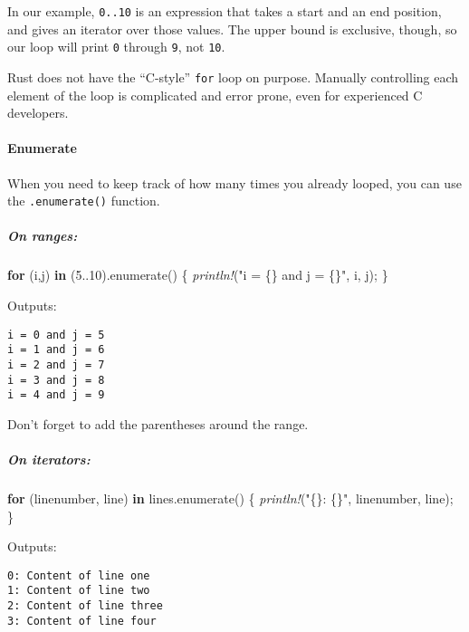 \documentclass[a4paper,]{book}
\newenvironment{Shaded}{\begin{snugshade}}{\end{snugshade}}
\newcommand{\KeywordTok}[1]{\textcolor[rgb]{0.13,0.29,0.53}{\textbf{{#1}}}}
\newcommand{\DecValTok}[1]{\textcolor[rgb]{0.00,0.00,0.81}{{#1}}}
\newcommand{\StringTok}[1]{\textcolor[rgb]{0.31,0.60,0.02}{{#1}}}
\newcommand{\PreprocessorTok}[1]{\textcolor[rgb]{0.56,0.35,0.01}{\textit{{#1}}}}
\newcommand{\NormalTok}[1]{{#1}}
\let\oldparagraph\paragraph
\renewcommand{\paragraph}[1]{\oldparagraph{#1}\mbox{}}
\let\oldsubparagraph\subparagraph
\renewcommand{\subparagraph}[1]{\oldsubparagraph{#1}\mbox{}}
\begin{document}
In our example, \texttt{0..10} is an expression that takes a start and
an end position, and gives an iterator over those values. The upper
bound is exclusive, though, so our loop will print \texttt{0} through
\texttt{9}, not \texttt{10}.

Rust does not have the ``C-style'' \texttt{for} loop on purpose.
Manually controlling each element of the loop is complicated and error
prone, even for experienced C developers.

\paragraph{Enumerate}\label{enumerate}

When you need to keep track of how many times you already looped, you
can use the \texttt{.enumerate()} function.

\subparagraph{On ranges:}\label{on-ranges}

\begin{Shaded}
\begin{Highlighting}[]
\KeywordTok{for} \NormalTok{(i,j) }\KeywordTok{in} \NormalTok{(}\DecValTok{5.}\NormalTok{.}\DecValTok{10}\NormalTok{).enumerate() \{}
    \PreprocessorTok{println!}\NormalTok{(}\StringTok{"i = \{\} and j = \{\}"}\NormalTok{, i, j);}
\NormalTok{\}}
\end{Highlighting}
\end{Shaded}

Outputs:

\begin{verbatim}
i = 0 and j = 5
i = 1 and j = 6
i = 2 and j = 7
i = 3 and j = 8
i = 4 and j = 9
\end{verbatim}

Don't forget to add the parentheses around the range.

\subparagraph{On iterators:}\label{on-iterators}

\begin{Shaded}
\begin{Highlighting}[]
\KeywordTok{for} \NormalTok{(linenumber, line) }\KeywordTok{in} \NormalTok{lines.enumerate() \{}
    \PreprocessorTok{println!}\NormalTok{(}\StringTok{"\{\}: \{\}"}\NormalTok{, linenumber, line);}
\NormalTok{\}}
\end{Highlighting}
\end{Shaded}

Outputs:

\begin{verbatim}
0: Content of line one
1: Content of line two
2: Content of line three
3: Content of line four
\end{verbatim}
\end{document}
